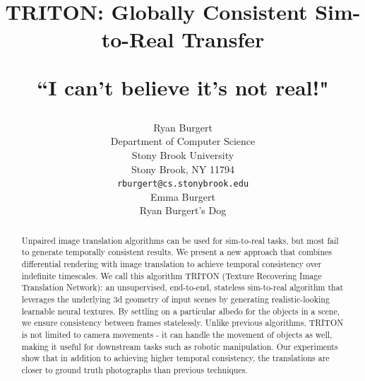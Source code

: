 \documentclass{article}
\title{TRITON: Globally Consistent Sim-to-Real Transfer

``I can't believe it's not real!" %
 }
\author{%
	Ryan Burgert \\
	Department of Computer Science\\
	Stony Brook University\\
	Stony Brook, NY 11794 \\
	\texttt{rburgert@cs.stonybrook.edu} \\
	\And
	Emma Burgert \\
	Ryan Burgert's Dog\\
}
\begin{document}
\maketitle


\begin{abstract}


	Unpaired image translation algorithms can be used for sim-to-real tasks, but most fail to generate temporally consistent results.
	We present a new approach that combines differential rendering with image translation to achieve temporal consistency over indefinite timescales.
%
	We call this algorithm TRITON (Texture Recovering Image Translation Network): an unsupervised, end-to-end, stateless sim-to-real algorithm that 
	leverages the underlying 3d geometry of input scenes by generating realistic-looking learnable neural textures.
%
	By settling on a particular albedo for the objects in a scene, we ensure consistency between frames statelessly.
	Unlike previous algorithms, TRITON is not limited to camera movements - it can handle the movement of objects as well, making it useful for downstream tasks such as robotic manipulation.
	Our experiments show that in addition to achieving higher temporal consistency, the translations are closer to ground truth photographs than previous techniques.

\end{abstract}

\end{document}
